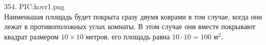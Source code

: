 354. {{PIC:kovr1.png}}\\
Наименьшая площадь будет покрыта сразу двумя коврами в том случае, когда они лежат в противоположных углах комнаты. В этом случае они вместе покрывают квадрат размером $10\times10$ метров, его площадь равна $10\cdot10=100\text{ м}^2.$\\
